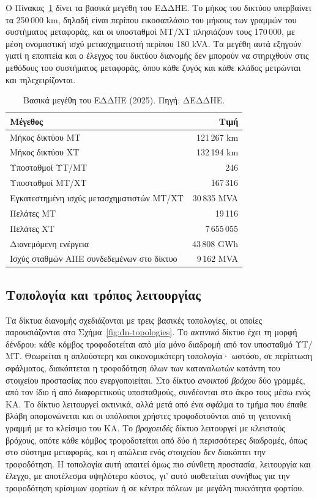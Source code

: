 Ο Πίνακας~\ref{tab:hedno} δίνει τα βασικά μεγέθη του ΕΔΔΗΕ. Το μήκος του δικτύου υπερβαίνει τα
250\,000 km, δηλαδή είναι περίπου εικοσαπλάσιο του μήκους των γραμμών του συστήματος μεταφοράς,
και οι υποσταθμοί ΜΤ/ΧΤ πλησιάζουν τους 170\,000, με μέση ονομαστική ισχύ μετασχηματιστή
περίπου 180 kVA. Τα μεγέθη αυτά εξηγούν γιατί η εποπτεία και ο έλεγχος του δικτύου διανομής δεν
μπορούν να στηριχθούν στις μεθόδους του συστήματος μεταφοράς, όπου κάθε ζυγός και κάθε κλάδος
μετρώνται και τηλεχειρίζονται.

\begin{table}[!htbp]
\centering
\begin{tabular}{lr}
\hline
Μέγεθος & Τιμή \\
\hline
Μήκος δικτύου ΜΤ & 121\,267 km \\
Μήκος δικτύου ΧΤ & 132\,194 km \\
Υποσταθμοί ΥΤ/ΜΤ & 246 \\
Υποσταθμοί ΜΤ/ΧΤ & 167\,316 \\
Εγκατεστημένη ισχύς μετασχηματιστών ΜΤ/ΧΤ & 30\,835 MVA \\
Πελάτες ΜΤ & 19\,116 \\
Πελάτες ΧΤ & 7\,655\,055 \\
Διανεμόμενη ενέργεια & 43\,808 GWh \\
Ισχύς σταθμών ΑΠΕ συνδεδεμένων στο δίκτυο & 9\,162 MVA \\
\hline
\end{tabular}
\caption{Βασικά μεγέθη του ΕΔΔΗΕ (2025). Πηγή: ΔΕΔΔΗΕ.}
\label{tab:hedno}
\end{table}

\subsection{Τοπολογία και τρόπος λειτουργίας}
\label{sec:dn-topology}

Τα δίκτυα διανομής σχεδιάζονται με τρεις βασικές τοπολογίες, οι οποίες παρουσιάζονται στο
Σχήμα~\ref{fig:dn-topologies}. Το \emph{ακτινικό} δίκτυο έχει τη μορφή δένδρου: κάθε κόμβος τροφοδοτείται από μία
μόνο διαδρομή από τον υποσταθμό ΥΤ/ΜΤ. Θεωρείται η απλούστερη και οικονομικότερη τοπολογία·
ωστόσο, σε περίπτωση σφάλματος, διακόπτεται η τροφοδότηση όλων των καταναλωτών κατάντη του
στοιχείου προστασίας που ενεργοποιείται. Στο δίκτυο \emph{ανοικτού βρόχου} δύο γραμμές, από
τον ίδιο ή από διαφορετικούς υποσταθμούς, συνδέονται στο άκρο τους μέσω ενός ΚΑ. Το
δίκτυο λειτουργεί ακτινικά, αλλά μετά από ένα σφάλμα το τμήμα που έπαθε βλάβη
απομονώνεται και οι υπόλοιποι χρήστες τροφοδοτούνται από τη γειτονική γραμμή με το
κλείσιμο του ΚΑ. Το \emph{βροχοειδές} δίκτυο λειτουργεί με κλειστούς
βρόχους, οπότε κάθε κόμβος τροφοδοτείται από δύο ή περισσότερες διαδρομές, όπως στο σύστημα
μεταφοράς, και η απώλεια ενός στοιχείου δεν διακόπτει την τροφοδότηση. Η τοπολογία αυτή
απαιτεί όμως πιο σύνθετη προστασία, λειτουργία και έλεγχο, με αποτέλεσμα υψηλότερο κόστος, γι'
αυτό υιοθετείται συνήθως για την τροφοδότηση κρίσιμων φορτίων ή σε κέντρα πόλεων με μεγάλη
πυκνότητα φορτίου.

